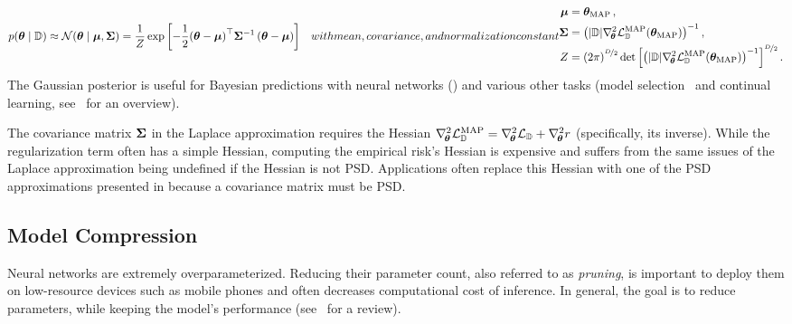 \begin{subequations}
  \begin{align}\label{eq:background::LaplaceApproximation}
    p(\giventhat{\vtheta}{\sD})
    \approx
    \gN(\giventhat{\vtheta}{\vmu, \mSigma})
    &=
      \frac{1}{Z}
      \exp\left[
      -\frac{1}{2}
      {\left(
      \vtheta - \vmu
      \right)}^{\top}
      \mSigma^{-1}
      \left(
      \vtheta - \vmu
      \right)
      \right]
  \end{align}
  with mean, covariance, and normalization constant
  \begin{align}
    \vmu
    &=
      \vtheta_{\text{MAP}}\,,
    \\
    \mSigma
    &=
      {\left(
      |\sD| \gradsquared{\vtheta} \gL_{\sD}^{\text{MAP}}(\vtheta_{\text{MAP}})
      \right)}^{-1}\,,
    \\
    Z
    &=
      {(2\pi)}^{\nicefrac{D}{2}}
      \det{\left[
      {\left(
      |\sD| \gradsquared{\vtheta} \gL_{\sD}^{\text{MAP}}(\vtheta_{\text{MAP}})
      \right)}^{-1}
      \right]}^{\nicefrac{D}{2}}\,.
  \end{align}
\end{subequations}
The Gaussian posterior  is useful for
Bayesian predictions with neural networks
() and various other tasks (\eg model
selection~\cite{immer2021scalable} and continual learning,
see~\cite{daxberger2021laplace} for an overview).

The covariance matrix ${\bm{\Sigma}}$ in the Laplace approximation requires the
Hessian $\nabla_{\!{{\bm{\theta}}}}^{2} {\mathcal{L}}_{{\mathbb{D}}}^{\text{MAP}} = \nabla_{\!{{\bm{\theta}}}}^{2}
{\mathcal{L}}_{{\mathbb{D}}} + \nabla_{\!{{\bm{\theta}}}}^{2} r$ (specifically, its inverse). While the
regularization term often has a simple Hessian, computing the empirical risk's
Hessian is expensive and suffers from the same issues of the Laplace
approximation being undefined if the Hessian is not PSD. Applications often
replace this Hessian with one of the PSD approximations presented in
 because a covariance matrix must
be PSD.

\subsection{Model Compression}

Neural networks are extremely overparameterized. Reducing their parameter count,
also referred to as \emph{pruning}, is important to deploy them on low-resource
devices such as mobile phones and often decreases computational cost of
inference. In general, the goal is to reduce parameters, while keeping the
model's performance (see~\cite{blalock2020state} for a review).

